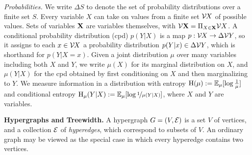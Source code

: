 \documentclass[twoside]{article}
\begin{document}
\textit{Probabilities.}
We write $\Delta S$ to denote the set of probability distributions over a finite set $S$.
Every variable $X$ can take on values from a finite set $\mathcal V\mskip-1.5mu X$ of possible values.
Sets of variables $\mathbf{X}$ are variables themselves, with
$\mathcal V \mathbf{X} = \Pi_{X \in \mathbf{X}} \mathcal V X$.
A conditional probability distribution (cpd) $p(Y|X)$ is a map
$p : \mathcal V\mskip-1.5mu  X \to \Delta \mathcal V Y$, so it assigns to each $x \in \mathcal V\mskip-1.5mu X$ a
probability distribution $p(Y|x) \in \Delta \mathcal V Y$, which is shorthand for $p(Y|X\!\!=\!x)$.
Given a joint distribution $\mu$ over many variables including both $X$ and $Y$,
we write $\mu(X)$ for its marginal distribution on $X$,
and $\mu(Y|X)$ for the cpd obtained by first conditioning on $X$ and then marginalizing to $Y$.
We measure information in a distribution with entropy $\operatorname{\mathrm{H}}(\mu) := \operatorname*{\mathbb{E}}_{\mu} [\log \frac1\mu]$ and conditional entropy $\operatorname{\mathrm{H}}_\mu(Y|X) := \operatorname*{\mathbb{E}}_\mu[\log\nicefrac1{\mu(Y|X)}]$, where $X$ and $Y$ are variables.



\textbf{Hypergraphs and Treewidth.}
A hypergraph $G = (V, \mathcal E)$ is a set $V$ of vertices, and a collection $\mathcal E$ of \emph{hyperedges}, which correspond to subsets of $V$.
An ordinary graph may be viewed as the special case in which every hyperedge contains  two vertices.
\end{document}
